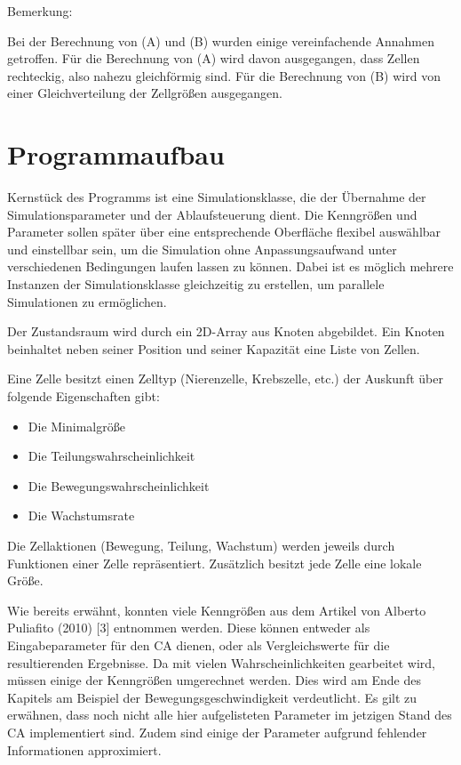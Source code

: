 \documentclass[11pt,a4paper,pointlessnumbers]{scrreprt}  %
\begin{document}
Bemerkung:\par 
Bei der Berechnung von (A) und (B) wurden einige vereinfachende Annahmen getroffen. Für die Berechnung von (A) wird davon ausgegangen, dass Zellen rechteckig, also nahezu gleichförmig sind. Für die Berechnung von (B) wird von einer Gleichverteilung der Zellgrößen ausgegangen.

\chapter{Programmaufbau}
Kernstück des Programms ist eine Simulationsklasse, die der Übernahme der Simulationsparameter und der Ablaufsteuerung dient. Die Kenngrößen und Parameter sollen später über eine entsprechende Oberfläche flexibel auswählbar und einstellbar sein, um die Simulation ohne Anpassungsaufwand unter verschiedenen Bedingungen laufen lassen zu können. Dabei ist es möglich mehrere Instanzen der Simulationsklasse gleichzeitig zu erstellen, um parallele Simulationen zu ermöglichen. \par 

Der Zustandsraum wird durch ein 2D-Array aus Knoten abgebildet. Ein Knoten beinhaltet neben seiner Position und seiner Kapazität eine Liste von Zellen. \par 

Eine Zelle besitzt einen Zelltyp (Nierenzelle, Krebszelle, etc.) der Auskunft über folgende Eigenschaften gibt:

\begin{itemize}
	\item Die Minimalgröße
	\item Die Teilungswahrscheinlichkeit
	\item Die Bewegungswahrscheinlichkeit
	\item Die Wachstumsrate
\end{itemize}

Die Zellaktionen (Bewegung, Teilung, Wachstum) werden jeweils durch Funktionen einer Zelle repräsentiert. Zusätzlich besitzt jede Zelle eine lokale Größe.

Wie bereits erwähnt, konnten viele Kenngrößen aus dem Artikel von Alberto Puliafito (2010) [3] entnommen werden. Diese können entweder als Eingabeparameter für den CA dienen, oder als Vergleichswerte für die resultierenden Ergebnisse. Da mit vielen Wahrscheinlichkeiten gearbeitet wird, müssen einige der Kenngrößen umgerechnet werden. Dies wird am Ende des Kapitels am Beispiel der Bewegungsgeschwindigkeit verdeutlicht. Es gilt zu erwähnen, dass noch nicht alle hier aufgelisteten Parameter im jetzigen Stand des CA implementiert sind. Zudem sind einige der Parameter aufgrund fehlender Informationen approximiert.
\end{document}
